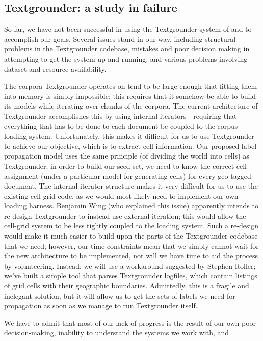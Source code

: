 \subsection{Textgrounder: a study in failure}
So far, we have not been successful in using the Textgrounder system of
\cite{wing-baldridge:11} and \cite{rolleretal:12} to accomplish our goals. 
Several issues stand in our way, including structural problems in the
Textgrounder codebase, mistakes and poor decision making in attempting to get
the system up and running, and various problems involving dataset and resource
availability.
\par
The corpora Textgrounder operates on tend to be large enough that fitting them
into memory is simply impossible; this requires that it somehow be able to
build its models while iterating over chunks of the corpora.
The current architecture of Textgrounder accomplishes this by using internal
iterators - requiring that everything that has to be done to each document be
coupled to the corpus-loading system.
Unfortunately, this makes it difficult for us to use Textgrounder to achieve
our objective, which is to extract cell information.
Our proposed label-propagation model uses the same principle (of dividing the
world into cells) as Textgrounder; in order to build our seed set, we need to
know the correct cell assignment (under a particular model for generating
cells) for every geo-tagged document.
The internal iterator structure makes it very difficult for us to use the
existing cell grid code, as we would most likely need to implement our own
loading harness.
Benjamin Wing (who explained this issue) apparently intends to re-design
Textgrounder to instead use external iteration; this would allow the cell-grid
system to be less tightly coupled to the loading system.
Such a re-design would make it much easier to build upon the parts of the
Textgrounder codebase that we need; however, our time constraints mean that we
simply cannot wait for the new architecture to be implemented, nor will we have
time to aid the process by volunteering.
Instead, we will use a workaround suggested by Stephen Roller; we've built a
simple tool that parses Textgrounder logfiles, which contain listings of grid
cells with their geographic boundaries.
Admittedly, this is a fragile and inelegant solution, but it will allow us to
get the sets of labels we need for propagation as soon as we manage to run
Textgrounder itself.
\par
We have to admit that most of our lack of progress is the result of our own
poor decision-making, inability to understand the systems we work with, and
